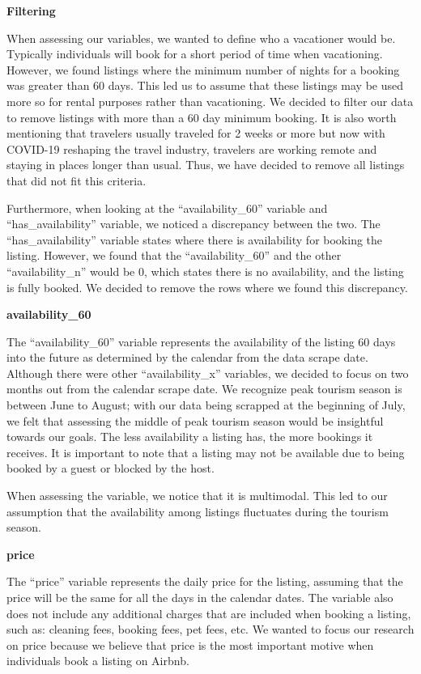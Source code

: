 \documentclass[
]{article}
\begin{document}
\textbf{Filtering}

When assessing our variables, we wanted to define who a vacationer would be. Typically individuals will book for a short period of time when vacationing. However, we found listings where the minimum number of nights for a booking was greater than 60 days. This led us to assume that these listings may be used more so for rental purposes rather than vacationing. We decided to filter our data to remove listings with more than a 60 day minimum booking. It is also worth mentioning that travelers usually traveled for 2 weeks or more but now with COVID-19 reshaping the travel industry, travelers are working remote and staying in places longer than usual. Thus, we have decided to remove all listings that did not fit this criteria.

Furthermore, when looking at the ``availability\_60'' variable and ``has\_availability'' variable, we noticed a discrepancy between the two. The ``has\_availability'' variable states where there is availability for booking the listing. However, we found that the ``availability\_60'' and the other ``availability\_n'' would be 0, which states there is no availability, and the listing is fully booked. We decided to remove the rows where we found this discrepancy.

\textbf{availability\_60}

The ``availability\_60'' variable represents the availability of the listing 60 days into the future as determined by the calendar from the data scrape date. Although there were other ``availability\_x'' variables, we decided to focus on two months out from the calendar scrape date. We recognize peak tourism season is between June to August; with our data being scrapped at the beginning of July, we felt that assessing the middle of peak tourism season would be insightful towards our goals. The less availability a listing has, the more bookings it receives. It is important to note that a listing may not be available due to being booked by a guest or blocked by the host.

When assessing the variable, we notice that it is multimodal. This led to our assumption that the availability among listings fluctuates during the tourism season.

\textbf{price}

The ``price'' variable represents the daily price for the listing, assuming that the price will be the same for all the days in the calendar dates. The variable also does not include any additional charges that are included when booking a listing, such as: cleaning fees, booking fees, pet fees, etc. We wanted to focus our research on price because we believe that price is the most important motive when individuals book a listing on Airbnb.
\end{document}
